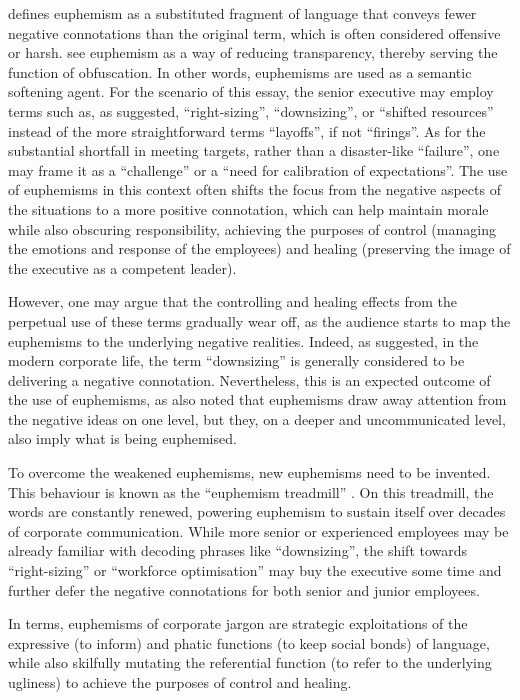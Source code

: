 \documentclass[a4paper,12pt]{article}
\begin{document}
\textcite{Stein1999} defines euphemism as a substituted fragment of language that conveys fewer negative connotations than the original term, which is often considered offensive or harsh.
\textcite{Rittenburg2016} see euphemism as a way of reducing transparency, thereby serving the function of obfuscation.
In other words, euphemisms are used as a semantic softening agent.
For the scenario of this essay, the senior executive may employ terms such as, as \textcite{Vickers2002} suggested, ``right-sizing'', ``downsizing'', or ``shifted resources'' instead of the more straightforward terms ``layoffs'', if not ``firings''.
As for the substantial shortfall in meeting targets, rather than a disaster-like ``failure'', one may frame it as a ``challenge'' or a ``need for calibration of expectations''.
The use of euphemisms in this context often shifts the focus from the negative aspects of the situations to a more positive connotation, which can help maintain morale while also obscuring responsibility, achieving the purposes of control (managing the emotions and response of the employees) and healing (preserving the image of the executive as a competent leader).

However, one may argue that the controlling and healing effects from the perpetual use of these terms gradually wear off, as the audience starts to map the euphemisms to the underlying negative realities.
Indeed, as \textcite{LumenLearning2026} suggested, in the modern corporate life, the term ``downsizing'' is generally considered to be delivering a negative connotation.
Nevertheless, this is an expected outcome of the use of euphemisms, as \textcite{Stein1999} also noted that euphemisms draw away attention from the negative ideas on one level, but they, on a deeper and uncommunicated level, also imply what is being euphemised.

To overcome the weakened euphemisms, new euphemisms need to be invented.
This behaviour is known as the ``euphemism treadmill'' \parencite{Pinker1994}.
On this treadmill, the words are constantly renewed, powering euphemism to sustain itself over decades of corporate communication.
While more senior or experienced employees may be already familiar with decoding phrases like ``downsizing'', the shift towards ``right-sizing'' or ``workforce optimisation'' may buy the executive some time and further defer the negative connotations for both senior and junior employees.

In  terms, euphemisms of corporate jargon are strategic exploitations of the expressive (to inform) and phatic functions (to keep social bonds) of language, while also skilfully mutating the referential function (to refer to the underlying ugliness) to achieve the purposes of control and healing.
\end{document}
